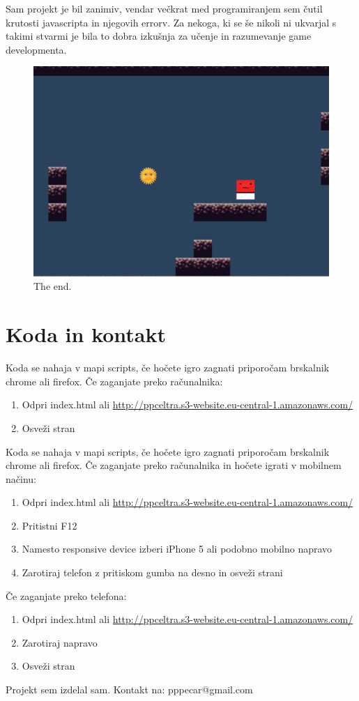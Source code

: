 \documentclass[a4paper,11pt]{article}
\begin{document}
Sam projekt je bil zanimiv, vendar večkrat med programiranjem sem čutil krutosti javascripta in njegovih errorv. Za nekoga, ki se še nikoli ni ukvarjal s takimi stvarmi je bila to dobra izkušnja za učenje in razumevanje game developmenta. 

\begin{figure}[htbp]
	\begin{center}
		\includegraphics[scale=0.4]{thegame.png}
		\caption{The end.}
		\label{game_scr}
	\end{center}
\end{figure}
\pagebreak

\section{Koda in kontakt}

Koda se nahaja v mapi scripts, če hočete igro zagnati priporočam brskalnik chrome ali firefox. Če zaganjate preko računalnika:
\begin{enumerate}
	\item Odpri index.html ali \url{http://ppceltra.s3-website.eu-central-1.amazonaws.com/}
	\item Osveži stran
\end{enumerate}

Koda se nahaja v mapi scripts, če hočete igro zagnati priporočam brskalnik chrome ali firefox. Če zaganjate preko računalnika in hočete igrati v mobilnem načinu:

\begin{enumerate}
	\item Odpri index.html ali \url{http://ppceltra.s3-website.eu-central-1.amazonaws.com/}
	\item Pritistni F12
	\item Namesto responsive device izberi iPhone 5 ali podobno mobilno napravo
	\item Zarotiraj telefon z pritiskom gumba na desno in osveži strani
\end{enumerate}

Če zaganjate preko telefona:
\begin{enumerate}
	\item Odpri index.html ali \url{http://ppceltra.s3-website.eu-central-1.amazonaws.com/}
	\item Zarotiraj napravo
	\item Osveži stran
\end{enumerate}

Projekt sem izdelal sam. Kontakt na: pppecar@gmail.com
\end{document}

